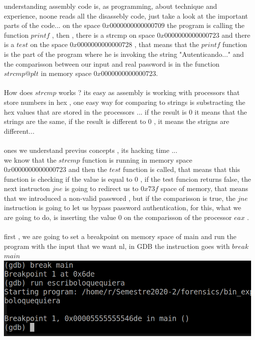 \documentclass[10pt,a4paper]{article} %
\begin{document}
            understanding assembly code is, as programming, about technique and
            experience, noone reads all the disassebly code, just take a look at
            the important parts of the code... on the space $ 0x0000000000000709  $
            the program is calling the function $ printf  $ , then , there is a
            strcmp on space $ 0x0000000000000723  $ and there is a $ test  $ on the
            space $ 0x0000000000000728  $  , that means that the $ printf  $
            function is the part of the program where he is invoking the string
            "Autenticando..." and the comparisson between our input and real
            password is in the function $ strcmp@plt  $ in memory space $
            0x0000000000000723  $.
            \\
            \\ How does $ strcmp  $ works ?  its easy as assembly is working with
            processors that store numbers in hex ,  one easy way for comparing to
            strings is substracting the hex values that are stored in the
            processors ... if the result is $ 0  $ it means that the strings are
            the same, if the result is different to 0 , it means the strigns are
            different...
            \\
            \\ ones we understand previus concepts , its hacking time ...
            \\ we know that the $ strcmp  $ function is running in memory space $
            0x0000000000000723  $ and then the $ test  $ function is called, that
            means that this function is checking if the value is equal to 0 , if
            the test funcion returns false, the next instructon $ jne   $  is going
            to redirect us to $ 0x73f  $ space of memory, that means that we
            introduced a non-valid password , but if the comparisson is true, the $
            jne  $ instruction is going to let us bypass password authentication,
            for this, what we are going to do, is inserting the value $ 0  $ on the
            comparisson of the processor $ eax  $ .
            \\

            \\ first , we are going to set a breakpoint on memory space of main and run the program with the input that we want nl, in
            GDB the instruction goes with $ break$  $main  $
            \\
            \includegraphics[width=0.4\linewidth]{running.png}
\end{document}

